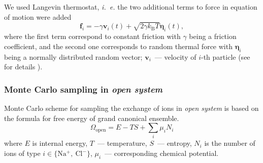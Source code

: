 \documentclass[journal,article,submit,pdftex,moreauthors]{Definitions/mdpi}
\newcommand{\ie}{\textit{i.~e.} }
\newcommand{\kT}{k_\mathrm{B}T}
\newcommand{\cl}{\mathrm{Cl^-}}
\newcommand{\na}{\mathrm{Na^+}}
\begin{document}
We used Langevin thermostat, \ie the two additional terms to force in equation of motion were added
\begin{equation}
\mathbf{f}_i =  -\gamma \mathbf{v}_i(t)+\sqrt{2\gamma \kT }\boldsymbol{\eta}_i(t),
\end{equation}
where the first term correspond to constant friction with $\gamma$ being a friction coefficient,
 and the second one corresponds to random thermal force with $\boldsymbol{\eta}_i$ being a normally distributed random vector; $\mathbf{v}_i$~--- velocity of $i$-th particle (see for details \cite{Grest1986}).

\subsubsection{Monte Carlo sampling in \emph{open system}}
Monte Carlo scheme for sampling the exchange of ions in \emph{open system} is based on the formula for free energy of grand canonical ensemble.
\begin{equation}
    \Omega_{\mathrm{open}}=E-TS+\sum_i\mu_i N_i\label{eq:Omega-GC}
\end{equation}
where $E$ is internal energy, $T$~--- temperature, $S$~--- entropy, $N_i$ is the number of ions of type $i\in\{\na,\ \cl\}$, $\mu_i$~--- corresponding chemical potential.
\end{document}
